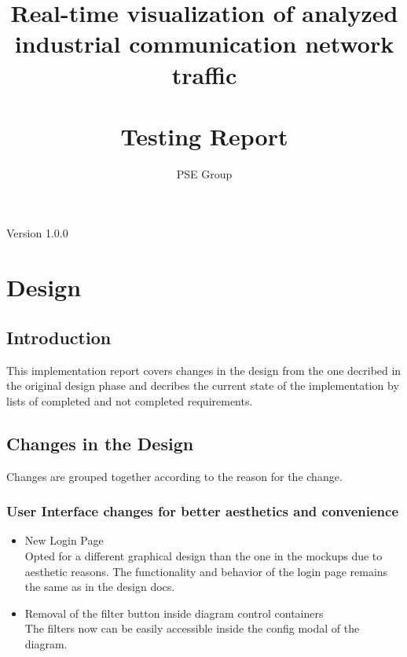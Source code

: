 \documentclass[oneside, english, final]{design}
\author{PSE Group}
\title{Real-time visualization of analyzed industrial communication network traffic\\ \hfill \\Testing Report}
\begin{document}
\nocite{*}

\setpdf

\maketitle


\hfill

\begin{center}
      \large{Version 1.0.0}
\end{center}


\thispagestyle{empty}
\begin{abstract}
      \thispagestyle{empty}
\end{abstract}

\thispagestyle{empty}
\newpage
\thispagestyle{empty}
\tableofcontents
\cleardoublepage
\setcounter{page}{1}


\section{Design}\label{sec:intro}
\subsection{Introduction}

This implementation report covers changes in the design from the one decribed in the original design phase
and decribes the current state of the implementation by lists of completed and not completed requirements.


\subsection{Changes in the Design}

Changes are grouped together according to the reason for the change.

\subsubsection{User Interface changes for better aesthetics and convenience}
\begin{itemize}
      \item{New Login Page
            \\
            Opted for a different graphical design than the one in the mockups due to aesthetic reasons. The functionality and behavior of the login page remains the same as in the design docs.}

      \item{Removal of the filter button inside diagram control containers
            \\
            The filters now can be easily accessible inside the config modal of the diagram.}
\end{itemize}
\end{document}
